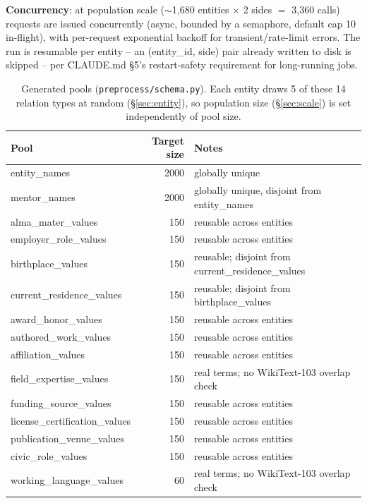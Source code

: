 \documentclass[11pt]{article}
\begin{document}
\textbf{Concurrency}: at population scale ($\sim$1{,}680 entities $\times$ 2
sides $=$ 3{,}360 calls) requests are issued concurrently (async, bounded by
a semaphore, default cap 10 in-flight), with per-request exponential backoff
for transient/rate-limit errors. The run is resumable per entity -- an
(entity\_id, side) pair already written to disk is skipped -- per CLAUDE.md
\S5's restart-safety requirement for long-running jobs.

\begin{table}[h]
\centering\small
\begin{tabular}{lrl}
\toprule
Pool & Target size & Notes \\
\midrule
entity\_names & 2000 & globally unique \\
mentor\_names & 2000 & globally unique, disjoint from entity\_names \\
alma\_mater\_values & 150 & reusable across entities \\
employer\_role\_values & 150 & reusable across entities \\
birthplace\_values & 150 & reusable; disjoint from current\_residence\_values \\
current\_residence\_values & 150 & reusable; disjoint from birthplace\_values \\
award\_honor\_values & 150 & reusable across entities \\
authored\_work\_values & 150 & reusable across entities \\
affiliation\_values & 150 & reusable across entities \\
field\_expertise\_values & 150 & real terms; no WikiText-103 overlap check \\
funding\_source\_values & 150 & reusable across entities \\
license\_certification\_values & 150 & reusable across entities \\
publication\_venue\_values & 150 & reusable across entities \\
civic\_role\_values & 150 & reusable across entities \\
working\_language\_values & 60 & real terms; no WikiText-103 overlap check \\
\bottomrule
\end{tabular}
\caption{Generated pools (\texttt{preprocess/schema.py}). Each entity draws 5 of
these 14 relation types at random (\S\ref{sec:entity}), so population size
(\S\ref{sec:scale}) is set independently of pool size.}
\label{tab:pools}
\end{table}
\end{document}
